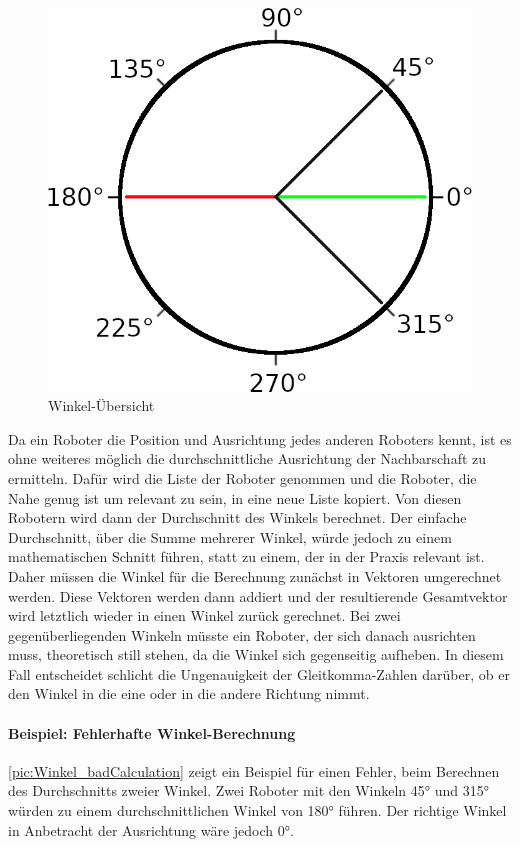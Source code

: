 \begin{figure}
	\includegraphics[width=\pictureWidth,keepaspectratio]{graphics/Winkel_badCalculation.png}
	\caption{Winkel-Übersicht}
	\label{pic:Winkel_badCalculation}
\end{figure}

Da ein Roboter die Position und Ausrichtung jedes anderen Roboters kennt, ist es ohne weiteres möglich die durchschnittliche Ausrichtung der Nachbarschaft zu ermitteln. Dafür wird die Liste der Roboter genommen und die Roboter, die Nahe genug ist um relevant zu sein, in eine neue Liste kopiert. Von diesen Robotern wird dann der Durchschnitt des Winkels berechnet. Der einfache Durchschnitt, über die Summe mehrerer Winkel, würde jedoch zu einem mathematischen Schnitt führen, statt zu einem, der in der Praxis relevant ist. Daher müssen die Winkel für die Berechnung zunächst in Vektoren umgerechnet werden. Diese Vektoren werden dann addiert und der resultierende Gesamtvektor wird letztlich wieder in einen Winkel zurück gerechnet. Bei zwei gegenüberliegenden Winkeln müsste ein Roboter, der sich danach ausrichten muss, theoretisch still stehen, da die Winkel sich gegenseitig aufheben. In diesem Fall entscheidet schlicht die Ungenauigkeit der Gleitkomma-Zahlen darüber, ob er den Winkel in die eine oder in die andere Richtung nimmt.

\paragraph*{Beispiel: Fehlerhafte Winkel-Berechnung}
\autoref{pic:Winkel_badCalculation} zeigt ein Beispiel für einen Fehler, beim Berechnen des Durchschnitts zweier Winkel. Zwei Roboter mit den Winkeln 45° und 315° würden zu einem durchschnittlichen Winkel von 180° führen. Der richtige Winkel in Anbetracht der Ausrichtung wäre jedoch 0°.
 
